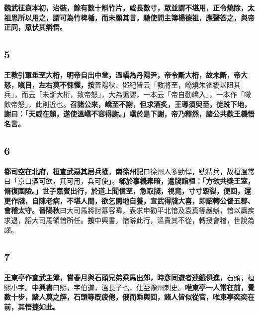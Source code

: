 \textbf{魏武征袁本初，治裝，餘有數十斛竹片，咸長數寸，眾並謂不堪用，正令燒除，太祖思所以用之，謂可為竹椑楯，而未顯其言，馳使問主簿楊德祖，應聲答之，與帝正同，眾伏其辯悟。}

\subsection*{5}

\textbf{王敦引軍垂至大桁，明帝自出中堂，溫嶠為丹陽尹，帝令斷大桁，故未斷，帝大怒，瞋目，左右莫不悚懼，}{\footnotesize \textbf{按}晉陽秋、鄧紀皆云「敦將至，嶠燒朱雀橋以阻其兵」，而云「未斷大桁，致帝怒」，大為譌謬，一本云「帝自勸嶠入」，一本作「噉飲帝怒」，此則近也。}\textbf{召諸公來，嶠至不謝，但求酒炙，王導須臾至，徒跣下地，謝曰：「天威在顏，遂使溫嶠不容得謝。」嶠於是下謝，帝乃釋然，諸公共歎王機悟名言。}

\subsection*{6}

\textbf{郗司空在北府，桓宣武惡其居兵權，}{\footnotesize \textbf{南徐州記}曰徐州人多勁悍，號精兵，故桓溫常曰「京口酒可飲，箕可用，兵可使」。}\textbf{郗於事機素暗，遣牋詣桓：「方欲共獎王室，脩復園陵。」世子嘉賓出行，於道上聞信至，急取牋，視竟，寸寸毀裂，便回，還更作牋，自陳老病，不堪人間，欲乞閑地自養，宣武得牋大喜，即詔轉公督五郡、會稽太守。}{\footnotesize \textbf{晉陽秋}曰大司馬將討慕容暐，表求申勸平北愔及袁真等嚴辦，愔以羸疾求退，詔大司馬領愔所任。\textbf{按}中興書，愔辭此行，溫責其不從，轉授會稽，世說為謬。}

\subsection*{7}

\textbf{王東亭作宣武主簿，嘗春月與石頭兄弟乘馬出郊，時彥同遊者連鑣俱進，}{\footnotesize 石頭，桓熙小字。\textbf{中興書}曰熙，字伯道，溫長子也，仕至豫州刺史。}\textbf{唯東亭一人常在前，覺數十步，諸人莫之解，石頭等既疲倦，俄而乘輿回，諸人皆似從官，唯東亭奕奕在前，其悟捷如此。}
